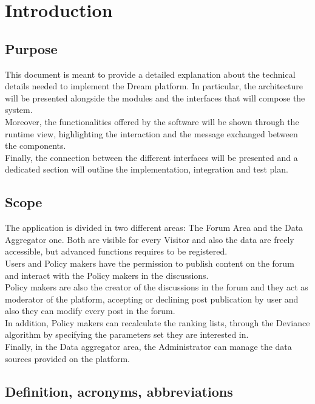 \section{Introduction}


\subsection{Purpose}

This document is meant to provide a detailed explanation about the technical details needed to implement the Dream platform. In particular, the architecture will be presented alongside the modules and the interfaces that will compose the system. \\
Moreover, the functionalities offered by the software will be shown through the runtime view, highlighting the interaction and the message exchanged between the components.\\
Finally, the connection between the different interfaces will be presented and a dedicated section will outline the implementation, integration and test plan.

\subsection{Scope}

The application is divided in two different areas: The Forum Area and the Data Aggregator one. Both are visible for every Visitor and also the data are freely accessible, but advanced functions requires to be registered.\\

Users and Policy makers have the permission to publish content on the forum and interact with the Policy makers in the discussions.\\

Policy makers are also the creator of the discussions in the forum and they act as moderator of the platform, accepting or declining post publication by user and also they can modify every post in the forum.\\
In addition, Policy makers can recalculate the ranking lists, through the Deviance algorithm by specifying the parameters set they are interested in.\\

Finally, in the Data aggregator area, the Administrator can manage the data sources provided on the platform. 


\subsection{Definition, acronyms, abbreviations}
